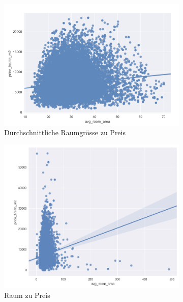 \begin{figure}[h]
  \begin{subfigure}{.5\textwidth}
    \centering
    \includegraphics[width=\linewidth]{images/anhang/analysis/avg_room_to_price.png}
    \caption{Durchschnittliche Raumgrösse zu Preis}
  \end{subfigure}
  \begin{subfigure}{.5\textwidth}
    \centering
    \includegraphics[width=\linewidth]{images/anhang/analysis/Raum_zu_Preis.png}
    \caption{Raum zu Preis}
  \end{subfigure}
  \begin{subfigure}{.5\textwidth}
    \centering

\end{subfigure}
\end{figure}
